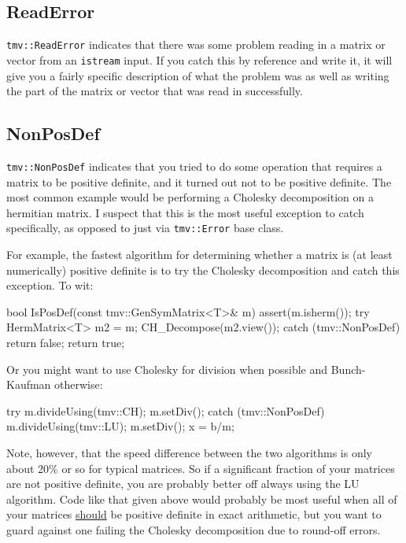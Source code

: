 \documentclass[twoside,letterpaper,11pt]{article}
\renewcommand{\tt}[1]{{\lstinline {#1}}}
\begin{document}
\subsection{ReadError}
\label{ReadError}

\tt{tmv::ReadError} indicates that there was some problem reading in a matrix or 
vector from an \tt{istream} input.  If you catch this by reference and write it,
it will give you a fairly specific description of what the problem was as well as
writing the part of the matrix or vector that was read in successfully.

\subsection{NonPosDef}
\label{NonPosDef}

\tt{tmv::NonPosDef} indicates that you tried to do some operation that requires
a matrix to be positive definite, and it turned out not to be positive definite.
The most common example would be performing a Cholesky decomposition on a 
hermitian matrix.  I suspect that this is the 
most useful exception to catch specifically, as opposed to just via \tt{tmv::Error} base class.

For example, the fastest algorithm for determining whether a matrix is 
(at least numerically) positive definite is to try the Cholesky decomposition
and catch this exception.  To wit:
\begin{tmvcode}
bool IsPosDef(const tmv::GenSymMatrix<T>& m)
{
    assert(m.isherm());
    try {
        HermMatrix<T> m2 = m;
        CH_Decompose(m2.view());
    }    
    catch (tmv::NonPosDef) {
        return false;
    }
    return true;
}
\end{tmvcode}
Or you might want to use Cholesky for division when possible and Bunch-Kaufman otherwise:
\begin{tmvcode}
try {
    m.divideUsing(tmv::CH);
    m.setDiv();
}
catch (tmv::NonPosDef) {
    m.divideUsing(tmv::LU);
    m.setDiv();
}
x = b/m;
\end{tmvcode}
Note, however, that the speed difference between the two algorithms is only about
20\% or so for typical matrices.  So if a significant fraction of your matrices are 
not positive definite, you are probably better off always using the LU algorithm.  
Code like that given above would probably be most useful when all of your 
matrices \underline{should} be positive definite in exact arithmetic, but you 
want to guard against one failing the Cholesky decomposition due to round-off
errors.
\end{document}
